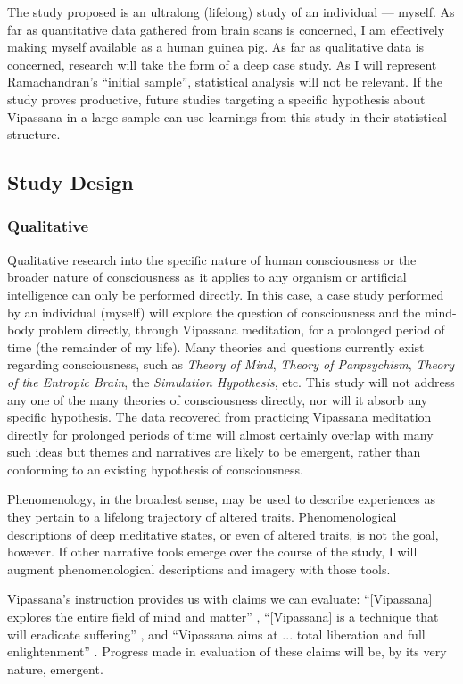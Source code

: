 \documentclass[a4paper, amsfonts, amssymb, amsmath, reprint, showkeys, nofootinbib, twoside]{revtex4-1}
\begin{document}
The study proposed is an ultralong (lifelong) study of an individual --- myself. As
far as quantitative data gathered from brain scans is concerned, I am effectively
making myself available as a human guinea pig. As far as qualitative data is
concerned, research will take the form of a deep case study. As I will represent
Ramachandran's ``initial sample'', statistical analysis will not be relevant. If the
study proves productive, future studies targeting a specific hypothesis about
Vipassana in a large sample can use learnings from this study in their statistical
structure.

\subsection{Study Design}

\subsubsection{Qualitative}

Qualitative research into the specific nature of human consciousness or the broader
nature of consciousness as it applies to any organism or artificial intelligence can
only be performed directly. In this case, a case study performed by an individual
(myself) will explore the question of consciousness and the mind-body problem
directly, through Vipassana meditation, for a prolonged period of time (the remainder
of my life). Many theories and questions currently exist regarding
consciousness, such as \textit{Theory of Mind}, \textit{Theory of Panpsychism},
\textit{Theory of the Entropic Brain},
the \textit{Simulation Hypothesis}, etc. This study will not address any one of the
many theories of consciousness
directly, nor will it absorb any specific hypothesis. The data recovered from
practicing Vipassana meditation directly for prolonged periods of time will almost
certainly overlap with many such ideas but themes and narratives are likely
to be emergent, rather than conforming to an existing hypothesis of consciousness.

Phenomenology, in the broadest sense, may be used to describe experiences as they
pertain to a lifelong trajectory of altered traits. Phenomenological descriptions of
deep meditative states, or even of altered traits, is not the goal,
however. If other narrative tools emerge over the course of the study, I will augment
phenomenological descriptions and imagery with those tools.

Vipassana's instruction provides us with claims we can evaluate: ``[Vipassana] explores the entire field of
mind and matter'' \cite{goenka1999discourses}, ``[Vipassana] is a technique that will
eradicate suffering'' \cite{dhammaorg2014code}, and ``Vipassana aims at ... total
liberation and full enlightenment'' \cite{dhammaorg2014code}. Progress made in
evaluation of these claims will be, by its very nature, emergent.
\end{document}
